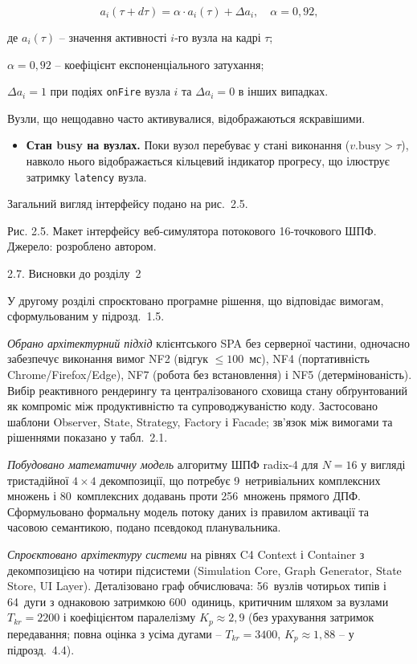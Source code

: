 \documentclass[
]{article}
\begin{document}
\begin{equation}
\tag{3.1}\label{eq:heatmap-decay}
a_{i}(\tau + d\tau) = \alpha \cdot a_{i}(\tau) + \Delta a_{i},\quad\alpha = 0{,}92,
\end{equation}

де \(a_{i}(\tau)\) -- значення активності \(i\)-го вузла на кадрі \(\tau\);

\(\alpha = 0{,}92\) -- коефіцієнт експоненціального затухання;

\(\Delta a_{i} = 1\) при подіях \texttt{onFire} вузла \(i\) та \(\Delta a_{i} = 0\) в інших випадках.

Вузли, що нещодавно часто активувалися, відображаються яскравішими.

\begin{itemize}
\item
  \textbf{Стан busy на вузлах.} Поки вузол перебуває у стані виконання
  (\(v.\text{busy} > \tau\)), навколо нього відображається кільцевий
  індикатор прогресу, що ілюструє затримку \texttt{latency} вузла.
\end{itemize}

Загальний вигляд інтерфейсу подано на рис.~2.5.

\protect{}\label{_Toc228121478}{}Рис. 2.5. Макет iнтерфейсу
веб-симулятора потокового 16-точкового ШПФ. Джерело: розроблено автором.

2.7. Висновки до розділу~2

У другому розділі спроєктовано програмне рішення, що відповідає вимогам,
сформульованим у підрозд.~1.5.

\emph{Обрано архітектурний підхід} клієнтського SPA без серверної
частини, одночасно забезпечує виконання вимог NF2 (відгук
\(\leq 100\)~мс), NF4 (портативність Chrome/Firefox/Edge), NF7 (робота
без встановлення) і NF5 (детермінованість). Вибір реактивного рендерингу
та централізованого сховища стану обґрунтований як компроміс між
продуктивністю та супроводжуваністю коду. Застосовано шаблони Observer,
State, Strategy, Factory і Facade; зв'язок між вимогами та рішеннями
показано у табл.~2.1.

\emph{Побудовано математичну модель} алгоритму ШПФ radix-4 для
\(N = 16\) у вигляді тристадійної \(4 \times 4\) декомпозиції, що
потребує 9~нетривіальних комплексних множень і 80~комплексних додавань
проти 256~множень прямого ДПФ. Сформульовано формальну модель потоку
даних із правилом активації та часовою семантикою, подано псевдокод
планувальника.

\emph{Спроєктовано архітектуру системи} на рівнях C4 Context і Container
з декомпозицією на чотири підсистеми (Simulation Core, Graph Generator,
State Store, UI Layer). Деталізовано граф обчислювача: 56~вузлів
чотирьох типів і 64~дуги з однаковою затримкою 600~одиниць, критичним
шляхом за вузлами \(T_{kr} = 2200\) і коефіцієнтом паралелізму
\(K_{p} \approx 2,9\) (без урахування затримок передавання; повна оцінка з
усіма дугами -- \(T_{kr} = 3400\), \(K_{p} \approx 1,88\) -- у підрозд.~4.4).
\end{document}
